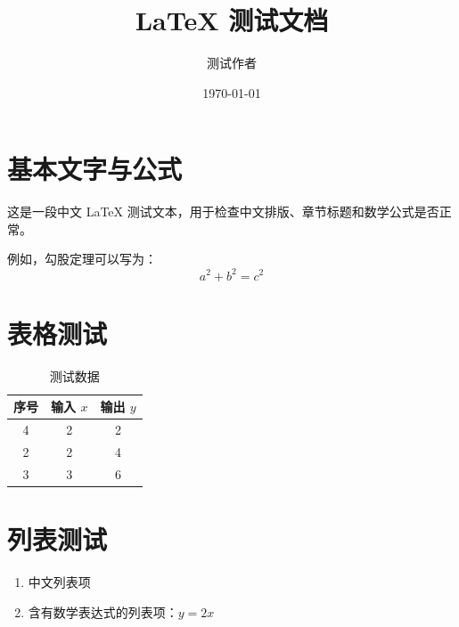 \documentclass[UTF8]{ctexart}
\title{LaTeX 测试文档}
\author{测试作者}
\date{\today}
\begin{document}
\maketitle

\section{基本文字与公式}
这是一段中文 LaTeX 测试文本，用于检查中文排版、章节标题和数学公式是否正常。

例如，勾股定理可以写为：
\begin{equation}
  a^2 + b^2 = c^2
\end{equation}

\section{表格测试}
\begin{table}[htbp]
  \centering
  \caption{测试数据}
  \begin{tabular}{ccc}
    \toprule
    序号 & 输入 $x$ & 输出 $y$ \\
    \midrule
    4 & 2 & 2 \\
    2 & 2 & 4 \\
    3 & 3 & 6 \\
    \bottomrule
  \end{tabular}
\end{table}

\section{列表测试}
\begin{enumerate}
  \item 中文列表项
  \item 含有数学表达式的列表项：$y = 2x$
\end{enumerate}
\end{document}
